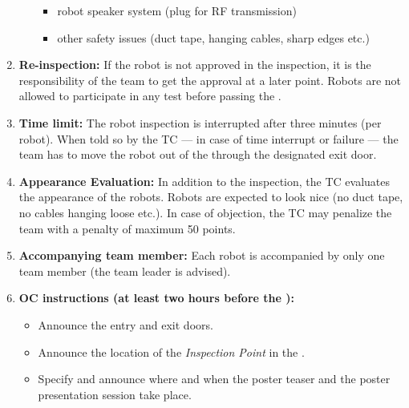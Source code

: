 \begin{enumerate}
\begin{itemize}
\begin{itemize}
			\item robot speaker system (plug for RF transmission)
			\item other safety issues (duct tape, hanging cables, sharp edges etc.)
		\end{itemize}
	\end{itemize}
	\item \textbf{Re-inspection:} If the robot is not approved in the inspection, it is the responsibility of the team to get the approval at a later point. Robots are not allowed to participate in any test before passing the \RobotInspection.
	\item \textbf{Time limit:} The robot inspection is interrupted after three minutes (per robot). When told so by the TC --- in case of time interrupt or failure --- the team has to move the robot out of the \Arena{} through the designated exit door.
	\item \textbf{Appearance Evaluation:} In addition to the inspection, the TC evaluates the appearance of the robots. Robots are expected to look nice (no duct tape, no cables hanging loose etc.). In case of objection, the TC may penalize the team with a penalty of maximum 50 points.
	\item \textbf{Accompanying team member:} Each robot is accompanied by only one team member (the team leader is advised).
	\item \textbf{OC instructions (at least two hours before the \RobotInspection):}
	\begin{itemize}
		\item Announce the entry and exit doors.
		\item Announce the location of the \textit{Inspection Point} in the \Arena{}.
		\item Specify and announce where and when the poster teaser and the poster presentation session take place.
	\end{itemize}
\end{enumerate}